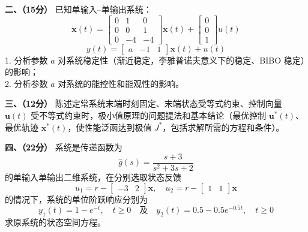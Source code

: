 \documentclass[11pt,a4paper]{ctexart}
\begin{document}
\vspace{1.5em}

\noindent
\textbf{二、（15分）} 已知单输入--单输出系统：
\begin{equation*}
    \dot{\bm{x}}(t) = \begin{bmatrix} 0 & 1 & 0 \\ 0 & 0 & 1 \\ 0 & -4 & -4 \end{bmatrix} \bm{x}(t) + \begin{bmatrix} 0 \\ 0 \\ 1 \end{bmatrix} u(t)
\end{equation*}
\begin{equation*}
    y(t) = \begin{bmatrix} a & -1 & 1 \end{bmatrix} \bm{x}(t) + u(t)
\end{equation*}
1. 分析参数 $a$ 对系统稳定性（渐近稳定，李雅普诺夫意义下的稳定、BIBO 稳定）的影响；\\
2. 分析参数 $a$ 对系统的能控性和能观性的影响。

\vspace{1.5em}

\noindent
\textbf{三、（12分）} 陈述定常系统末端时刻固定、末端状态受等式约束、控制向量 $\bm{u}(t)$ 受不等式约束时，极小值原理的问题提法和基本结论（最优控制 $\bm{u}^*(t)$、最优轨迹 $\bm{x}^*(t)$，使性能泛函达到极值 $J^*$，包括求解所需的方程和条件）。

\newpage %

\noindent
\textbf{四、（22分）} 系统是传递函数为
\begin{equation*}
    \hat{g}(s) = \frac{s + 3}{s^2 + 3s + 2}
\end{equation*}
的单输入单输出二维系统，在分别选取状态反馈
\begin{equation*}
    u_1 = r - \begin{bmatrix} -3 & 2 \end{bmatrix} \bm{x}, \quad u_2 = r - \begin{bmatrix} 1 & 1 \end{bmatrix} \bm{x}
\end{equation*}
的情况下，系统的单位阶跃响应分别为
\begin{equation*}
    y_1(t) = 1 - e^{-t}, \quad t \ge 0 \quad \text{及} \quad y_2(t) = 0.5 - 0.5e^{-0.5t}, \quad t \ge 0
\end{equation*}
求原系统的状态空间方程。
\end{document}

